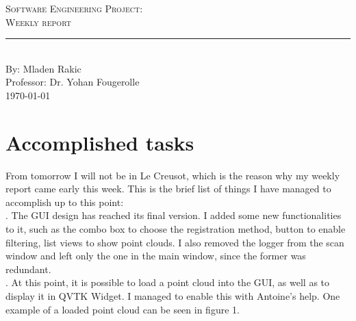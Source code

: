 \documentclass[aps,letterpaper,11pt]{revtex4}
\newcommand{\labno}{Software Engineering Project}
\newcommand{\labtitle}{Weekly report}
\newcommand{\authorname}{Mladen Rakic}
\newcommand{\professor}{Dr. Yohan Fougerolle}
\begin{document}
  
\begin{titlepage}
\begin{center}
{\LARGE \textsc{\labno:} \\ \vspace{4pt}}
{\Large \textsc{\labtitle} \\ \vspace{4pt}} 
\rule[13pt]{\textwidth}{1pt} \\ \vspace{150pt}
{\large By: \authorname \\ \vspace{10pt}
Professor: \professor \\ \vspace{10pt}
\today}
\end{center}


\end{titlepage}%
\newpage
\section {Accomplished tasks}
From tomorrow I will not be in Le Creusot, which is the reason why my weekly report came early this week. This is the brief list of things I have managed to accomplish up to this point:\\
. The GUI design has reached its final version. I added some new functionalities to it, such as the combo box to choose the registration method, button to enable filtering, list views to show point clouds. I also removed the logger from the scan window and left only the one in the main window, since the former was redundant.\\ 
. At this point, it is possible to load a point cloud into the GUI, as well as to display it in QVTK Widget. I managed to enable this with Antoine's help. One example of a loaded point cloud can be seen in figure 1. \\ 
\linebreak
\end{document}
